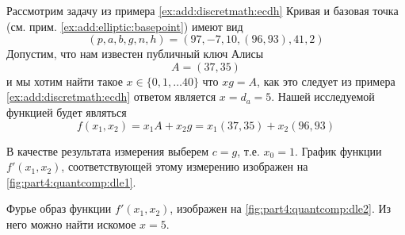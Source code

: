 \begin{example}
Рассмотрим задачу из примера \ref{ex:add:discretmath:ecdh}
Кривая и базовая точка (см. прим. \ref{ex:add:elliptic:basepoint})
имеют вид
\[
(p,a,b,g,n,h) = (97, -7, 10, (96,93), 41, 2)
\]
Допустим, что нам известен публичный ключ Алисы
\[
A = (37, 35)
\]
и мы хотим найти такое $x \in \{0,1, \dots 40\}$ что
$x g = A$, как это следует из примера \ref{ex:add:discretmath:ecdh}
ответом является $x = d_a  = 5$.
Нашей исследуемой функцией будет являться
\[
f\left(x_1,x_2\right) = x_1 A + x_2 g = x_1 (37,35) + x_2 (96,93)
\]



В качестве результата измерения выберем $c = g$, т.е. $x_0 = 1$.
График функции $f'(x_1, x_2)$, соответствующей этому измерению
изображен на \autoref{fig:part4:quantcomp:dle1}.



Фурье образ функции $f'(x_1, x_2)$, изображен на
\autoref{fig:part4:quantcomp:dle2}. Из него можно найти искомое $x =
5$. 

\end{example}
